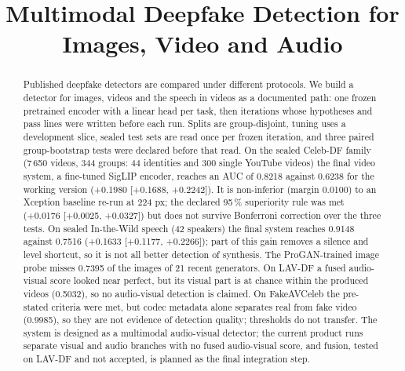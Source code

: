 \documentclass[conference,a4paper]{IEEEtran_nodash}
\newcommand{\papertitle}{Multimodal Deepfake Detection for Images, Video and Audio}
\newcommand{\collegetitlecolour}[1]{#1}
\begin{document}
\title{\collegetitlecolour{\papertitle}}

\author{%
}

\ifcollegestyle
  \collegefrontmatter   %
  \collegestartpaper    %
\fi

\maketitle

\begin{abstract}
Published deepfake detectors are compared under different protocols. We build a detector for images,
videos and the speech in videos as a documented path: one frozen pretrained
encoder with a linear head per task, then iterations whose hypotheses and pass
lines were written before each run. Splits are group-disjoint, tuning uses a
development slice, sealed test sets are read once per frozen iteration, and
three paired group-bootstrap tests were declared before that read. On the sealed
Celeb-DF family (7\,650 videos, 344 groups: 44 identities and 300 single YouTube
videos) the final video system, a fine-tuned SigLIP encoder, reaches an AUC of
0.8218 against 0.6238 for the working version (+0.1980 [+0.1688, +0.2242]). It is
non-inferior (margin 0.0100) to an Xception baseline re-run at 224 px; the
declared 95\,\% superiority rule was met (+0.0176 [+0.0025, +0.0327]) but does
not survive Bonferroni correction over the three tests. On sealed In-the-Wild
speech (42 speakers) the final system reaches 0.9148 against 0.7516 (+0.1633
[+0.1177, +0.2266]); part of this gain removes a silence and level shortcut, so
it is not all better detection of synthesis. The ProGAN-trained image probe
misses 0.7395 of the images of 21 recent generators. On LAV-DF a fused
audio-visual score looked near perfect, but its visual part is at chance within
the produced videos (0.5032), so no audio-visual detection is claimed. On
FakeAVCeleb the pre-stated criteria were met, but codec metadata alone separates
real from fake video (0.9985), so they are not evidence of detection quality;
thresholds do not transfer. The system is designed as a multimodal audio-visual
detector; the current product runs separate visual and audio branches with no fused
audio-visual score, and fusion, tested on LAV-DF and not accepted, is planned as the
final integration step.
\end{abstract}
\end{document}
